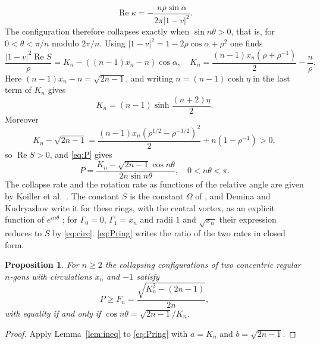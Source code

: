 \documentclass[11pt]{article}
\newtheorem{proposition}{Proposition}
\theoremstyle{definition}
\newcommand{\re}{\operatorname{Re}}
\begin{document}
\[
  \re\kappa = -\frac{n\rho\sin\alpha}{2\pi|1 - v|^2}.
\]
The configuration therefore collapses exactly when $\sin n\theta > 0$, that is, for $0 < \theta < \pi/n$ modulo $2\pi/n$. Using $|1 - v|^2 = 1 - 2\rho\cos\alpha + \rho^2$ one finds
\[
  \frac{|1 - v|^2 \re S}{\rho} = K_n - ((n - 1)x_n - n)\cos\alpha, \quad
  K_n = \frac{(n - 1)x_n(\rho + \rho^{-1})}{2} - \frac{n}{\rho}.
\]
Here $(n - 1)x_n - n = \sqrt{2n - 1}$, and writing $n = (n - 1)\cosh\eta$ in the last term of $K_n$ gives
\[
  K_n = (n - 1)\sinh\frac{(n + 2)\eta}{2}.
\]
Moreover
\[
  K_n - \sqrt{2n - 1} = \frac{(n - 1)x_n(\rho^{1/2} - \rho^{-1/2})^2}{2} + n(1 - \rho^{-1}) > 0,
\]
so $\re S > 0$, and \eqref{eq:P} gives
\begin{equation}\label{eq:Pring}
  P = \frac{K_n - \sqrt{2n - 1}\cos n\theta}{2n\sin n\theta}, \quad 0 < n\theta < \pi.
\end{equation}
The collapse rate and the rotation rate as functions of the relative angle are given by Koiller et al.\ \cite[Sect.~11]{koiller1985}. The constant $S$ is the constant $\Omega$ of \cite[Eq.~(11)]{dk2014}, and Demina and Kudryashov write it for these rings, with the central vortex, as an explicit function of $e^{in\theta}$ \cite[Eq.~(36)]{dk2014}; for $\Gamma_0 = 0$, $\Gamma_1 = x_n$ and radii $1$ and $\sqrt{x_n}$ their expression reduces to $S$ by \eqref{eq:circ}. \eqref{eq:Pring} writes the ratio of the two rates in closed form.

\begin{proposition}\label{prop:rings}
For $n \ge 2$ the collapsing configurations of two concentric regular $n$-gons with circulations $x_n$ and $-1$ satisfy
\[
  P \ge F_n = \frac{\sqrt{K_n^2 - (2n - 1)}}{2n},
\]
with equality if and only if $\cos n\theta = \sqrt{2n - 1}/K_n$.
\end{proposition}

\begin{proof}
Apply Lemma~\ref{lem:ineq} to \eqref{eq:Pring} with $a = K_n$ and $b = \sqrt{2n - 1}$.
\end{proof}
\end{document}
